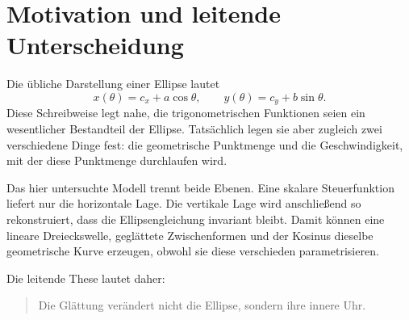 \section{Motivation und leitende Unterscheidung}

Die übliche Darstellung einer Ellipse lautet
\[
  x(\theta)=c_x+a\cos\theta,
  \qquad
  y(\theta)=c_y+b\sin\theta.
\]
Diese Schreibweise legt nahe, die trigonometrischen Funktionen seien ein
wesentlicher Bestandteil der Ellipse. Tatsächlich legen sie aber zugleich zwei
verschiedene Dinge fest: die geometrische Punktmenge und die Geschwindigkeit,
mit der diese Punktmenge durchlaufen wird.

Das hier untersuchte Modell trennt beide Ebenen. Eine skalare Steuerfunktion
liefert nur die horizontale Lage. Die vertikale Lage wird anschließend so
rekonstruiert, dass die Ellipsengleichung invariant bleibt. Damit können eine
lineare Dreieckswelle, geglättete Zwischenformen und der Kosinus dieselbe
geometrische Kurve erzeugen, obwohl sie diese verschieden parametrisieren.

Die leitende These lautet daher:
\begin{quote}
Die Glättung verändert nicht die Ellipse, sondern ihre innere Uhr.
\end{quote}

